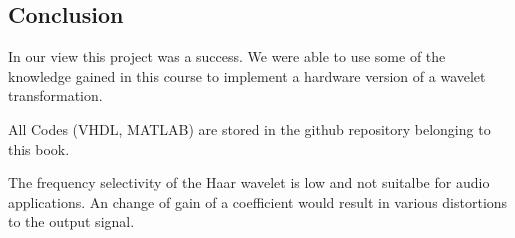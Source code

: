 \begin{refsection}







\section{Conclusion}

In our view this project was a success. We were able to use some of the knowledge gained in this course to implement a hardware version of a wavelet transformation.

All Codes (VHDL, MATLAB) are stored in the github repository belonging to this book. \cite{fpga:gitrepo-wavelets}

The frequency selectivity of the Haar wavelet is low and not suitalbe for audio applications.
An change of gain of a coefficient would result in various distortions to the output signal.

\printbibliography[heading=subbibliography]
\end{refsection}
